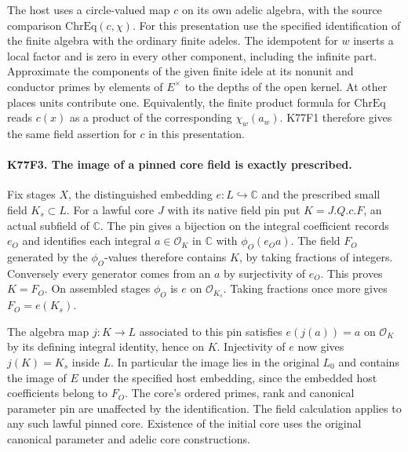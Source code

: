 The host uses a circle-valued map $c$ on its own adelic algebra,
with the source comparison $\mathrm{ChrEq}(c,\chi)$. For this
presentation use the specified identification of the finite algebra
with the ordinary finite adeles. The idempotent for $w$ inserts a
local factor and is zero in every other component, including the
infinite part. Approximate the components of the given finite idele
at its nonunit and conductor primes by elements of $E^\times$ to
the depths of the open kernel. At other places units contribute one.
Equivalently, the finite product formula for $\mathrm{ChrEq}$ reads
$c(x)$ as a product of the corresponding $\chi_w(a_w)$. K77F1
therefore gives the same field assertion for $c$ in this presentation.

\paragraph{K77F3. The image of a pinned core field is exactly prescribed.}
Fix stages $X$, the distinguished embedding $e:L\hookrightarrow
\mathbb C$ and the prescribed small field $K_s\subset L$.
For a lawful core $J$ with its native field pin put $K=J.Q.c.F$,
an actual subfield of $\mathbb C$. The pin gives a bijection on
the integral coefficient records $e_O$ and identifies each integral
$a\in\mathcal O_K$ in $\mathbb C$ with $\phi_O(e_O a)$.
The field $F_O$ generated by the $\phi_O$-values therefore contains
$K$, by taking fractions of integers. Conversely every generator
comes from an $a$ by surjectivity of $e_O$. This proves $K=F_O$.
On assembled stages $\phi_O$ is $e$ on $\mathcal O_{K_s}$.
Taking fractions once more gives $F_O=e(K_s)$.

The algebra map $j:K\to L$ associated to this pin satisfies
$e(j(a))=a$ on $\mathcal O_K$ by its defining integral identity,
hence on $K$. Injectivity of $e$ now gives $j(K)=K_s$ inside $L$.
In particular the image lies in the original $L_0$ and contains
the image of $E$ under the specified host embedding, since the
embedded host coefficients belong to $F_O$. The core's ordered
primes, rank and canonical parameter pin are unaffected by the
identification. The field calculation applies to any such lawful
pinned core. Existence of the initial core uses the original
canonical parameter and adelic core constructions.

